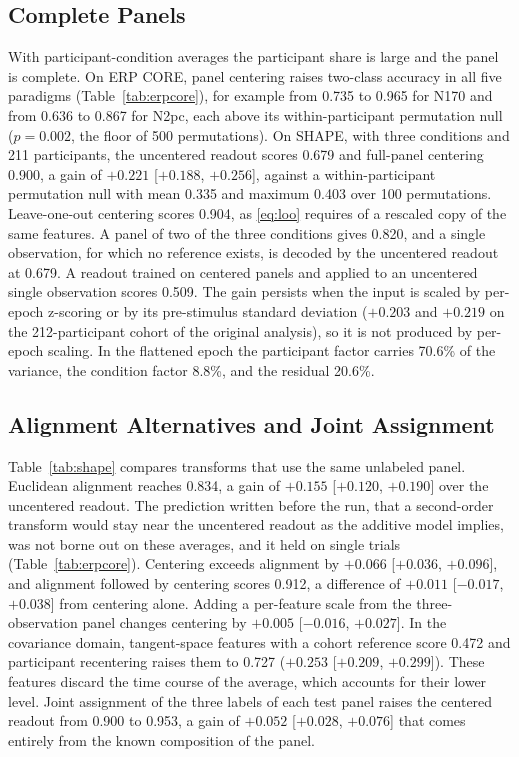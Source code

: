 

\subsection{Complete Panels}
With participant-condition averages the participant share is large and the panel is complete. On ERP CORE, panel centering raises two-class accuracy in all five paradigms (Table~\ref{tab:erpcore}), for example from 0.735 to 0.965 for N170 and from 0.636 to 0.867 for N2pc, each above its within-participant permutation null ($p=0.002$, the floor of 500 permutations). On SHAPE, with three conditions and 211 participants, the uncentered readout scores 0.679 and full-panel centering 0.900, a gain of $+0.221$ [$+0.188$, $+0.256$], against a within-participant permutation null with mean 0.335 and maximum 0.403 over 100 permutations. Leave-one-out centering scores 0.904, as \eqref{eq:loo} requires of a rescaled copy of the same features. A panel of two of the three conditions gives 0.820, and a single observation, for which no reference exists, is decoded by the uncentered readout at 0.679. A readout trained on centered panels and applied to an uncentered single observation scores 0.509. The gain persists when the input is scaled by per-epoch z-scoring or by its pre-stimulus standard deviation ($+0.203$ and $+0.219$ on the 212-participant cohort of the original analysis), so it is not produced by per-epoch scaling. In the flattened epoch the participant factor carries 70.6\% of the variance, the condition factor 8.8\%, and the residual 20.6\%.



\subsection{Alignment Alternatives and Joint Assignment}
Table~\ref{tab:shape} compares transforms that use the same unlabeled panel. Euclidean alignment reaches 0.834, a gain of $+0.155$ [$+0.120$, $+0.190$] over the uncentered readout. The prediction written before the run, that a second-order transform would stay near the uncentered readout as the additive model implies, was not borne out on these averages, and it held on single trials (Table~\ref{tab:erpcore}). Centering exceeds alignment by $+0.066$ [$+0.036$, $+0.096$], and alignment followed by centering scores 0.912, a difference of $+0.011$ [$-0.017$, $+0.038$] from centering alone. Adding a per-feature scale from the three-observation panel changes centering by $+0.005$ [$-0.016$, $+0.027$]. In the covariance domain, tangent-space features with a cohort reference score 0.472 and participant recentering raises them to 0.727 ($+0.253$ [$+0.209$, $+0.299$]). These features discard the time course of the average, which accounts for their lower level. Joint assignment of the three labels of each test panel raises the centered readout from 0.900 to 0.953, a gain of $+0.052$ [$+0.028$, $+0.076$] that comes entirely from the known composition of the panel.
